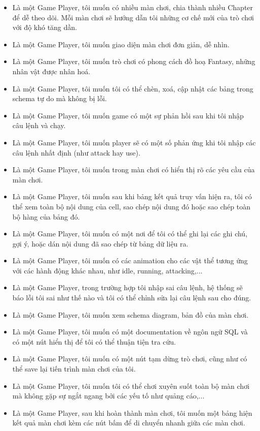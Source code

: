 \begin{itemize}
	\item Là một Game Player, tôi muốn có nhiều màn chơi, chia thành nhiều Chapter để dễ theo dõi. Mỗi màn chơi sẽ hướng dẫn tôi những cơ chế mới của trò chơi với độ khó tăng dần.
	\item Là một Game Player, tôi muốn giao diện màn chơi đơn giản, dễ nhìn.
	\item Là một Game Player, tôi muốn trò chơi có phong cách đồ hoạ Fantasy, những nhân vật được nhân hoá.
	\item Là một Game Player, tôi muốn tôi có thể chèn, xoá, cập nhật các bảng trong schema tự do mà không bị lỗi.
	\item Là một Game Player, tôi muốn game có một sự phản hồi sau khi tôi nhập câu lệnh và chạy.
	\item Là một Game Player, tôi muốn player sẽ có một số phản ứng khi tôi nhập các câu lệnh nhất định (như attack hay use).
	\item Là một Game Player, tôi muốn trong màn chơi có hiển thị rõ các yêu cầu của màn chơi.
	\item Là một Game Player, tôi muốn sau khi bảng kết quả truy vấn hiện ra, tôi có thể xem toàn bộ nội dung của cell, sao chép nội dung đó hoặc sao chép toàn bộ hàng của bảng đó.
	\item Là một Game Player, tôi muốn có một nơi để tôi có thể ghi lại các ghi chú, gợi ý, hoặc dán nội dung đã sao chép từ bảng dữ liệu ra.
	\item Là một Game Player, tôi muốn có các animation cho các vật thể tương ứng với các hành động khác nhau, như idle, running, attacking,...
	\item Là một Game Player, trong trường hợp tôi nhập sai câu lệnh, hệ thống sẽ báo lỗi tôi sai như thế nào và tôi có thể chỉnh sửa lại câu lệnh sau cho đúng. 
	\item Là một Game Player, tôi muốn xem schema diagram, bản đồ của màn chơi.
	\item Là một Game Player, tôi muốn có một documentation về ngôn ngữ SQL và có một nút hiển thị để tôi có thể thuận tiện tra cứu.
	\item Là một Game Player, tôi muốn có một nút tạm dừng trò chơi, cũng như có thể save lại tiến trình màn chơi của tôi.
	\item Là một Game Player, tôi muốn tôi có thể chơi xuyên suốt toàn bộ màn chơi mà không gặp sự ngắt ngang bởi các yếu tố như quảng cáo,...
	\item Là một Game Player, sau khi hoàn thành màn chơi, tôi muốn một bảng hiện kết quả màn chơi kèm các nút bấm để di chuyển nhanh giữa các màn chơi.
\end{itemize}



